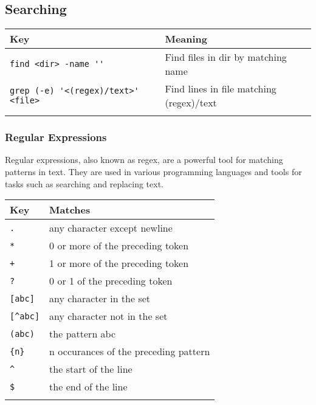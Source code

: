 \documentclass{article}
\begin{document}
\subsection{Searching}
\begin{table}[H]
      \begin{tabular}{ll}
            \textbf{Key}                                  & \textbf{Meaning}                         \\ \hline
            \lstinline|find <dir> -name ''|               & Find files in dir by matching name       \\ \arrayrulecolor{lightgray}\hline
            \lstinline|grep (-e) '<(regex)/text>' <file>| & Find lines in file matching (regex)/text \\ \arrayrulecolor{lightgray}\hline
      \end{tabular}
\end{table}

\subsubsection{Regular Expressions}

Regular expressions, also known as regex, are a powerful tool for matching patterns in text. They are used in various programming languages and tools for tasks such as searching and replacing text.

\begin{table}[H]
      \begin{tabular}{ll}
            \textbf{Key}       & \textbf{Matches}                      \\ \hline
            \lstinline|.|      & any character except newline          \\ \hline
            \lstinline|*|      & 0 or more of the preceding token      \\ \hline
            \lstinline|+|      & 1 or more of the preceding token      \\ \hline
            \lstinline|?|      & 0 or 1 of the preceding token         \\ \hline
            \lstinline|[abc]|  & any character in the set              \\ \hline
            \lstinline|[^abc]| & any character not in the set          \\ \hline
            \lstinline|(abc)|  & the pattern abc                       \\ \hline
            \lstinline|{n}|    & n occurances of the preceding pattern \\ \hline
            \lstinline|^|      & the start of the line                 \\ \hline
            \lstinline|$|      & the end of the line                   \\ \hline
      \end{tabular}
\end{table}
\end{document}
